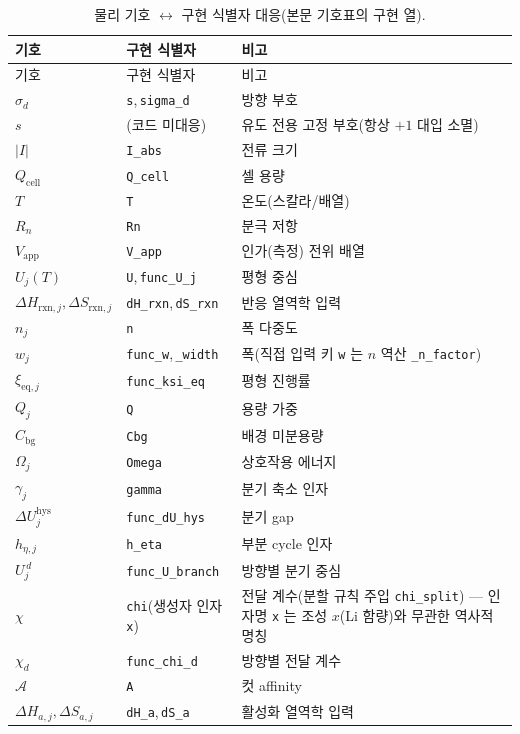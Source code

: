 \documentclass[11pt,a4paper]{article}
\newcommand{\eq}{\mathrm{eq}}
\newcommand{\app}{\mathrm{app}}
\newcommand{\cell}{\mathrm{cell}}
\newcommand{\bg}{\mathrm{bg}}
\newcommand{\rxn}{\mathrm{rxn}}
\newcommand{\hys}{\mathrm{hys}}
\newcommand{\code}[1]{\texttt{#1}}
\begin{document}
\begin{longtable}{p{} p{} p{}}
\caption{물리 기호 $\leftrightarrow$ 구현 식별자 대응(본문 기호표의 구현 열).}\label{tab:symcode}\\
\toprule 기호 & 구현 식별자 & 비고 \\ \midrule \endfirsthead
\toprule 기호 & 구현 식별자 & 비고 \\ \midrule \endhead
$\sigma_d$ & \code{s},\,\code{sigma\_d} & 방향 부호 \\
$s$ & (코드 미대응) & 유도 전용 고정 부호(항상 $+1$ 대입 소멸) \\
$|I|$ & \code{I\_abs} & 전류 크기 \\
$Q_\cell$ & \code{Q\_cell} & 셀 용량 \\
$T$ & \code{T} & 온도(스칼라/배열) \\
$R_n$ & \code{Rn} & 분극 저항 \\
$V_\app$ & \code{V\_app} & 인가(측정) 전위 배열 \\
$U_j(T)$ & \code{U},\,\code{func\_U\_j} & 평형 중심 \\
$\Delta H_{\rxn,j},\Delta S_{\rxn,j}$ & \code{dH\_rxn},\,\code{dS\_rxn} & 반응 열역학 입력 \\
$n_j$ & \code{n} & 폭 다중도 \\
$w_j$ & \code{func\_w},\,\code{\_width} & 폭(직접 입력 키 \code{w} 는 $n$ 역산 \code{\_n\_factor}) \\
$\xi_{\eq,j}$ & \code{func\_ksi\_eq} & 평형 진행률 \\
$Q_j$ & \code{Q} & 용량 가중 \\
$C_\bg$ & \code{Cbg} & 배경 미분용량 \\
$\Omega_j$ & \code{Omega} & 상호작용 에너지 \\
$\gamma_j$ & \code{gamma} & 분기 축소 인자 \\
$\Delta U_j^\hys$ & \code{func\_dU\_hys} & 분기 gap \\
$h_{\eta,j}$ & \code{h\_eta} & 부분 cycle 인자 \\
$U_j^{\,d}$ & \code{func\_U\_branch} & 방향별 분기 중심 \\
$\chi$ & \code{chi}(생성자 인자 \code{x}) & 전달 계수(분할 규칙 주입 \code{chi\_split}) — 인자명
\code{x} 는 조성 $x$(Li 함량)와 무관한 역사적 명칭 \\
$\chi_d$ & \code{func\_chi\_d} & 방향별 전달 계수 \\
$\mathcal A$ & \code{A} & 컷 affinity \\
$\Delta H_{a,j},\Delta S_{a,j}$ & \code{dH\_a},\,\code{dS\_a} & 활성화 열역학 입력 \\

\end{longtable}
\end{document}
